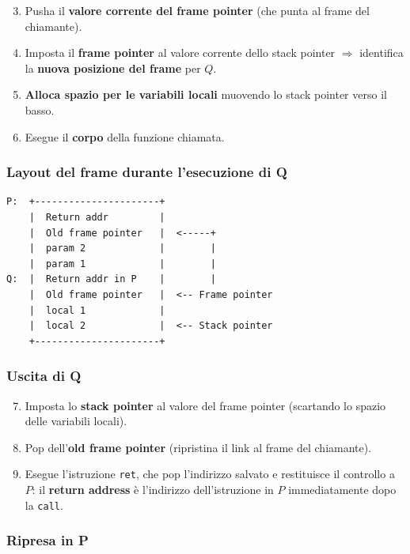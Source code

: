 \begin{enumerate}
  \setcounter{enumi}{2}
  \item Pusha il \textbf{valore corrente del frame pointer} (che punta al frame del chiamante).
  \item Imposta il \textbf{frame pointer} al valore corrente dello stack pointer $\Rightarrow$ identifica la \textbf{nuova posizione del frame} per $Q$.
  \item \textbf{Alloca spazio per le variabili locali} muovendo lo stack pointer verso il basso.
  \item Esegue il \textbf{corpo} della funzione chiamata.
\end{enumerate}

\subsubsection{Layout del frame durante l'esecuzione di Q}

\begin{verbatim}
P:  +----------------------+
    |  Return addr         |
    |  Old frame pointer   |  <-----+
    |  param 2             |        |
    |  param 1             |        |
Q:  |  Return addr in P    |        |
    |  Old frame pointer   |  <-- Frame pointer
    |  local 1             |
    |  local 2             |  <-- Stack pointer
    +----------------------+
\end{verbatim}

\subsubsection{Uscita di Q}

\begin{enumerate}
  \setcounter{enumi}{6}
  \item Imposta lo \textbf{stack pointer} al valore del frame pointer (scartando lo spazio delle variabili locali).
  \item Pop dell'\textbf{old frame pointer} (ripristina il link al frame del chiamante).
  \item Esegue l'istruzione \texttt{ret}, che pop l'indirizzo salvato e restituisce il controllo a $P$: il \textbf{return address} \`e l'indirizzo dell'istruzione in $P$ immediatamente dopo la \texttt{call}.
\end{enumerate}

\subsubsection{Ripresa in P}

